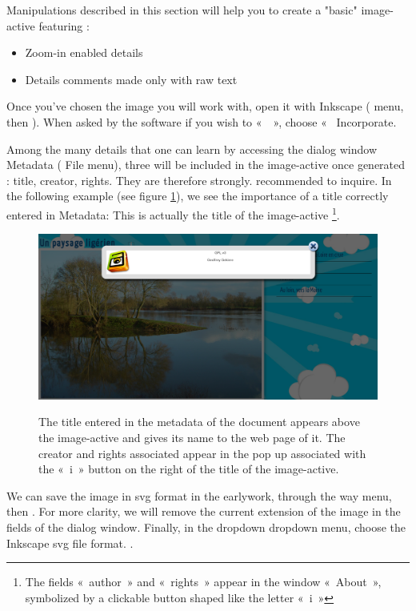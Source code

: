 Manipulations described in this section will help you to
create a "basic" image-active featuring :
\begin{itemize}
 \item Zoom-in enabled details
 \item Details comments made only with raw text
\end{itemize}


Once you've chosen the image you will work with, open it with Inkscape 
( menu, then ).  When asked by the software
if you wish to «~~», choose «~\chemin
{Incorporate}.

Among the many details that one can learn by accessing the 
dialog window  Metadata (\chemin
{File} menu), three will be included in the image-active once
generated : title, creator, rights. They are therefore strongly.
recommended to inquire. In the following example (see figure \ref{titre_ia}),
we see the importance of a title correctly entered in
Metadata: This is actually the title of the image-active  \footnote{The
fields «~author~» and «~rights~» appear in the window
«~About~», symbolized by a clickable button shaped like the letter «~i~»}.

\begin{figure}[htp]
 \centering
 \caption{The title entered in the metadata of the document appears above 
the image-active and gives its name to the web page of it. The creator and 
 rights associated appear in the pop up associated with the «~i~» button 
on the right of the title of the image-active.}
 \includegraphics[width=\textwidth]{images/titre_ia}
 \label{titre_ia}
\end{figure}

We can save the image in svg format in the earlywork, 
through the way  menu, then . 
For more clarity, we will remove the current extension of the image 
in the fields  of the dialog window. Finally, in the 
dropdown dropdown menu, choose the Inkscape svg file format. .

